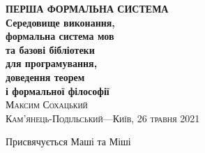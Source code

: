 \frontmatter
\thispagestyle{empty}
\mbox{}\vspace{1in}
\noindent
\begin{flushright}
\vspace{0.5cm}
\textbf{\Huge ПЕРША ФОРМАЛЬНА СИСТЕМА} \\
\vspace{0.5cm}
\textbf{\huge Середовище виконання, \\
        \huge формальна система мов \\
        \huge та базові бібліотеки \\
        \huge для програмування, \\
        \huge доведення теорем \\
        \huge і формальної філософії \\
}
\vspace{1em}
\vspace{6cm}
\hfill{\Large\scshape{}Максим Сохацький}
\\
\vspace{0.3cm}
\hfill{\scshape{}Кам'янець-Подільський---Київ, 26 травня 2021}
\end{flushright}
\cleartorecto
\tableofcontents*
\epigraph{Присвячується Маші та Міші}{}
\mainmatter
